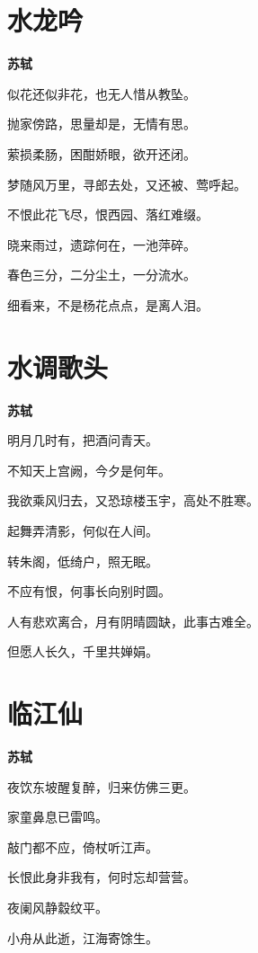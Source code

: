 \documentclass[12pt,a4paper]{ctexbook}
\begin{document}
\section{水龙吟}
\textbf{苏轼}\par\vspace{0.5em}
似花还似非花，也无人惜从教坠。\par
抛家傍路，思量却是，无情有思。\par
萦损柔肠，困酣娇眼，欲开还闭。\par
梦随风万里，寻郎去处，又还被、莺呼起。\par
不恨此花飞尽，恨西园、落红难缀。\par
晓来雨过，遗踪何在，一池萍碎。\par
春色三分，二分尘土，一分流水。\par
细看来，不是杨花点点，是离人泪。\par

\section{水调歌头}
\textbf{苏轼}\par\vspace{0.5em}
明月几时有，把酒问青天。\par
不知天上宫阙，今夕是何年。\par
我欲乘风归去，又恐琼楼玉宇，高处不胜寒。\par
起舞弄清影，何似在人间。\par
转朱阁，低绮户，照无眠。\par
不应有恨，何事长向别时圆。\par
人有悲欢离合，月有阴晴圆缺，此事古难全。\par
但愿人长久，千里共婵娟。\par

\section{临江仙}
\textbf{苏轼}\par\vspace{0.5em}
夜饮东坡醒复醉，归来仿佛三更。\par
家童鼻息已雷鸣。\par
敲门都不应，倚杖听江声。\par
长恨此身非我有，何时忘却营营。\par
夜阑风静縠纹平。\par
小舟从此逝，江海寄馀生。\par
\end{document}

